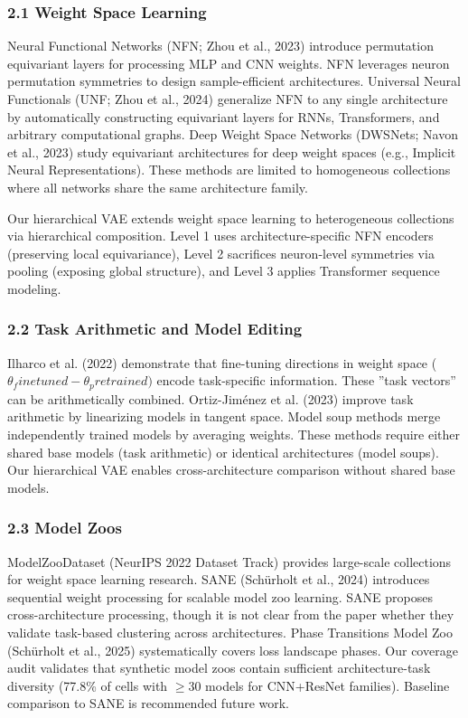 
\subsubsection{2.1 Weight Space Learning}

Neural Functional Networks (NFN; Zhou et al., 2023) introduce permutation equivariant layers for processing MLP and CNN weights. NFN leverages neuron permutation symmetries to design sample-efficient architectures. Universal Neural Functionals (UNF; Zhou et al., 2024) generalize NFN to any single architecture by automatically constructing equivariant layers for RNNs, Transformers, and arbitrary computational graphs. Deep Weight Space Networks (DWSNets; Navon et al., 2023) study equivariant architectures for deep weight spaces (e.g., Implicit Neural Representations). These methods are limited to homogeneous collections where all networks share the same architecture family.

Our hierarchical VAE extends weight space learning to heterogeneous collections via hierarchical composition. Level 1 uses architecture-specific NFN encoders (preserving local equivariance), Level 2 sacrifices neuron-level symmetries via pooling (exposing global structure), and Level 3 applies Transformer sequence modeling.

\subsubsection{2.2 Task Arithmetic and Model Editing}

Ilharco et al. (2022) demonstrate that fine-tuning directions in weight space ($\theta _finetuned - \theta _pretrained)$ encode task-specific information. These ''task vectors'' can be arithmetically combined. Ortiz-Jiménez et al. (2023) improve task arithmetic by linearizing models in tangent space. Model soup methods \citep{wortsman2022model} merge independently trained models by averaging weights. These methods require either shared base models (task arithmetic) or identical architectures (model soups). Our hierarchical VAE enables cross-architecture comparison without shared base models.

\subsubsection{2.3 Model Zoos}

ModelZooDataset (NeurIPS 2022 Dataset Track) provides large-scale collections for weight space learning research. SANE (Schürholt et al., 2024) introduces sequential weight processing for scalable model zoo learning. SANE proposes cross-architecture processing, though it is not clear from the paper whether they validate task-based clustering across architectures. Phase Transitions Model Zoo (Schürholt et al., 2025) systematically covers loss landscape phases. Our coverage audit validates that synthetic model zoos contain sufficient architecture-task diversity (77.8\% of cells with $\geq 30$ models for CNN+ResNet families). Baseline comparison to SANE is recommended future work.

